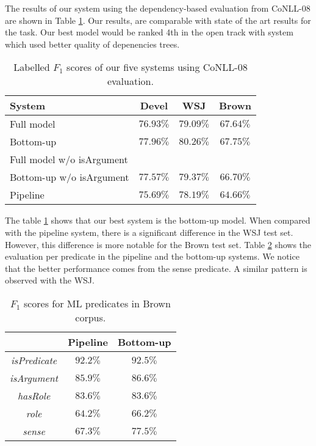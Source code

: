 
The results of our system using the dependency-based evaluation from CoNLL-08
are shown in Table \ref{tbl:results}. Our results, are comparable with state of
the art results for the task. Our best model would be ranked 4th in the open
track with system which used better quality of depenencies trees. 

\begin{table}[ht]
    \centering
    \begin{tabular}{|p{2.5cm}|c|c|c|}\hline
        System                    & Devel      & WSJ       & Brown \\\hline 
        Full model                & $76.93\%$  & $79.09\%$ & $67.64\%$ \\
        Bottom-up                 & $77.96\%$  & $80.26\%$ & $67.75\%$ \\
        Full model w/o isArgument &            &           &           \\
        Bottom-up  w/o isArgument & $77.57\%$  & $79.37\%$ & $66.70\%$ \\
        Pipeline                  & $75.69\%$  & $78.19\%$ & $64.66\%$ \\\hline
    \end{tabular}
    \caption{Labelled $F_1$ scores of our five systems using CoNLL-08
    evaluation.}
    \label{tbl:results}
\end{table}

The table \ref{tbl:results} shows that our best system is the bottom-up model. When compared with
the pipeline system, there is a significant difference in the WSJ test set. However, this difference
is more notable for the Brown test set. Table \ref{tbl:predicates} shows the
evaluation per predicate in the pipeline and the bottom-up systems. We notice
that the better performance comes from the sense predicate. A similar pattern is
observed with the WSJ.


\begin{table}[ht]

    \centering
    \begin{tabular}{|c|c|c|}\hline
                                  & Pipeline  &  Bottom-up \\\hline 
        \emph{isPredicate}        & $92.2\%$  & $92.5\%$  \\
        \emph{isArgument}         & $85.9\%$  & $86.6\%$  \\
        \emph{hasRole}            & $83.6\%$  & $83.6\%$  \\
        \emph{role}               & $64.2\%$  & $66.2\%$  \\
        \emph{sense}              & $67.3\%$  & $77.5\%$  \\\hline
    \end{tabular}
    \caption{$F_1$ scores for ML predicates in Brown corpus.}
    \label{tbl:predicates}
\end{table}

